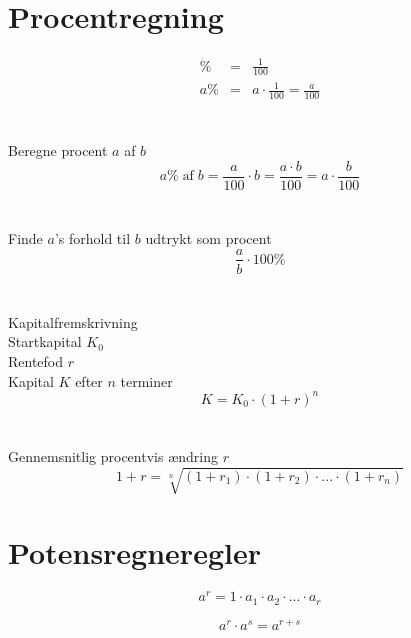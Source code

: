 \documentclass[11pt,a5paper,fleqn,leqno]{book}
\begin{document}
\newpage

\section{Procentregning}

\begin{eqnarray} \label{eq:procent}
\% & = & \frac{1}{100} \\
a\% & = & a \cdot \frac{1}{100} = \frac{a}{100} \nonumber
\end{eqnarray}
\\
\\
Beregne procent $a$ af $b$
\begin{equation} \label{eq:procent_beregne}
a\% \; \text{af} \; b = \frac{a}{100} \cdot b = \frac{a \cdot b}{100} = a \cdot \frac{b}{100}
\end{equation}
\\
\\
Finde $a$'s forhold til $b$ udtrykt som procent
\begin{equation} \label{eq:procent_finde}
\frac{a}{b} \cdot 100\% 
\end{equation}
\\
\\
Kapitalfremskrivning \\
Startkapital $K_0$ \\
Rentefod $r$ \\
Kapital $K$ efter $n$ terminer
\begin{equation} \label{eq:procent_kapital}
K = K_{0} \cdot \left(1+r\right)^{n}
\end{equation}
\\
\\
Gennemsnitlig procentvis ændring $r$
\begin{equation} \label{eq:procent_gennemsnit_aendring}
1+r = \sqrt[n]{\left(1+r_{1}\right) \cdot \left(1+r_{2}\right) \cdot ... \cdot \left(1+r_{n}\right)}
\end{equation} 

\newpage

\section{Potensregneregler}

\begin{equation} \label{eq:potens}
a^r = 1 \cdot a_1 \cdot a_2 \cdot ... \cdot a_r
\end{equation}

\begin{equation} \label{eq:potens_gange}
a^r \cdot a^s = a^{r+s}
\end{equation}
\end{document}
